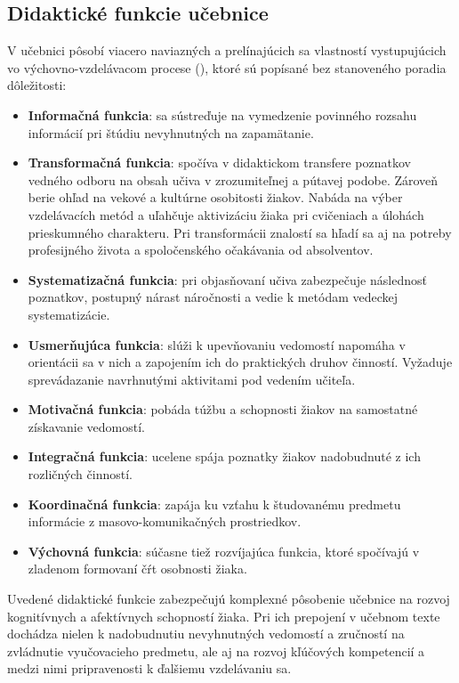 \subsection{Didaktické funkcie učebnice}
V učebnici pôsobí viacero naviazných a prelínajúcich sa vlastností vystupujúcich vo výchovno-vzdelávacom procese (\cite{zujev_ako_1986}), ktoré sú popísané bez stanoveného poradia dôležitosti:
\begin{itemize}
\itemsep0pt
\item \textbf{Informačná funkcia}: sa sústreďuje na vymedzenie povinného rozsahu informácií pri štúdiu nevyhnutných na zapamätanie.
\item \textbf{Transformačná funkcia}: spočíva v didaktickom transfere poznatkov vedného odboru na obsah učiva v zrozumiteľnej a pútavej podobe. Zároveň berie ohľad na vekové a kultúrne osobitosti žiakov. Nabáda na výber vzdelávacích metód a uľahčuje aktivizáciu žiaka pri cvičeniach a úlohách prieskumného charakteru. Pri transformácii znalostí sa hľadí sa aj na potreby profesijného života a spoločenského očakávania od absolventov.
\item \textbf{Systematizačná funkcia}: pri objasňovaní učiva zabezpečuje následnosť poznatkov, postupný nárast náročnosti a vedie k metódam vedeckej systematizácie.
\item \textbf{Usmerňujúca funkcia}: slúži k upevňovaniu vedomostí napomáha v orientácii sa v nich a zapojením ich do praktických druhov činností. Vyžaduje sprevádazanie navrhnutými aktivitami pod vedením učiteľa.
\item \textbf{Motivačná funkcia}: pobáda túžbu a schopnosti žiakov na samostatné získavanie vedomostí.
\item \textbf{Integračná funkcia}: ucelene spája poznatky žiakov nadobudnuté z ich rozličných činností.
\item \textbf{Koordinačná funkcia}: zapája ku vzťahu k študovanému predmetu informácie z masovo-komunikačných prostriedkov.
\item \textbf{Výchovná funkcia}: súčasne tiež rozvíjajúca funkcia, ktoré spočívajú v zladenom formovaní čŕt osobnosti žiaka.
\end{itemize}
Uvedené didaktické funkcie zabezpečujú komplexné pôsobenie učebnice na rozvoj kognitívnych a afektívnych schopností žiaka. Pri ich prepojení v učebnom texte dochádza nielen k nadobudnutiu nevyhnutných vedomostí a zručností na zvládnutie vyučovacieho predmetu, ale aj na rozvoj kľúčových kompetencií a medzi nimi pripravenosti k ďalšiemu vzdelávaniu sa.


